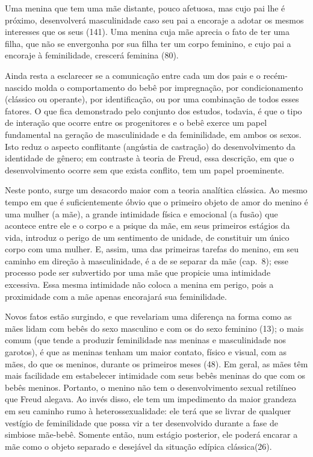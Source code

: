  Uma menina que tem uma mãe distante, pouco afetuosa, mas cujo pai lhe é
próximo, desenvolverá masculinidade\idxpaismasc{} caso\idxmascumen{} seu pai a encoraje a adotar os
mesmos interesses que os seus (141). Uma menina cuja mãe aprecia o fato
de ter uma filha, que não se envergonha por sua filha ter um corpo
feminino, e cujo pai a encoraje à feminilidade, crescerá feminina (80).

 Ainda resta a esclarecer se a comunicação entre cada um dos pais e o
recém-nascido molda o comportamento do bebê por impregnação, por
condicionamento (clássico ou operante), por identificação, ou por uma
combinação de todos esses fatores. O que fica demonstrado pelo conjunto
dos estudos, todavia, é que o tipo de interação que ocorre entre os
progenitores e o bebê exerce um papel fundamental na geração de
masculinidade e da feminilidade, em ambos os sexos. Isto reduz o
aspecto conflitante (angústia de castração)\idxcastaconf{} do desenvolvimento da
identidade de gênero; em contraste à teoria de Freud, essa descrição,
em que o desenvolvimento ocorre sem que exista conflito, tem um papel
proeminente.

 Neste ponto, surge um desacordo maior com a teoria analítica clássica.
Ao mesmo tempo em que é suficientemente óbvio que o primeiro objeto de
amor do menino é uma mulher (a mãe), a grande intimidade física e
emocional (a fusão) que acontece entre ele e o corpo e a psique da mãe,
 em seus primeiros estágios da vida, introduz o perigo de um sentimento
de unidade, de constituir um único corpo com uma mulher. E, assim, uma
das primeiras tarefas do menino, em seu caminho em direção à
masculinidade, é a de se separar da mãe (cap.~8); esse processo pode
ser subvertido por uma mãe que propicie uma intimidade excessiva. Essa
mesma intimidade não coloca a menina em perigo, pois a proximidade com
a mãe apenas encorajará sua feminilidade.

 Novos fatos estão surgindo, e que revelariam uma diferença na forma
como as mães lidam com bebês do sexo masculino e com os do sexo
feminino (13); o mais comum (que tende a produzir feminilidade nas
meninas e masculinidade nos garotos), é que as meninas tenham um maior
contato, físico e visual, com as mães, do que os meninos, durante os
primeiros meses (48). Em geral, as mães têm mais facilidade em
estabelecer intimidade com seus bebês meninas do que com os bebês
meninos. Portanto, o menino não tem o desenvolvimento sexual retilíneo
que Freud alegava. Ao invés disso, ele tem um impedimento da maior
grandeza em seu caminho rumo à heterossexualidade: ele terá que se
livrar de qualquer vestígio de feminilidade que possa vir a ter
desenvolvido durante a fase de simbiose mãe-bebê. Somente então, num
estágio posterior, ele poderá encarar a mãe como o objeto separado e
desejável da situação edípica clássica\idxmaesdese[|)] (26).

